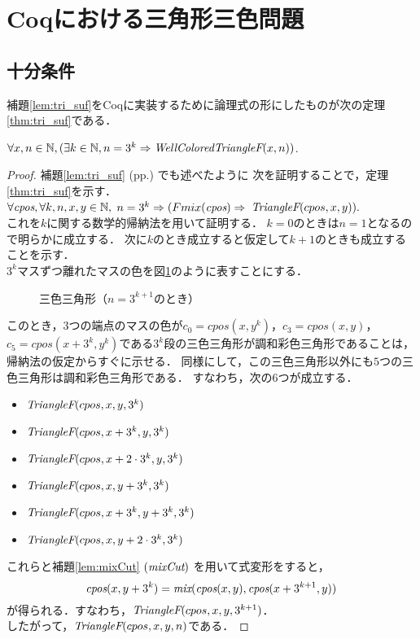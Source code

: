 \section{Coqにおける三角形三色問題}

\subsection{十分条件}
補題\ref{lem:tri_suf}をCoqに実装するために論理式の形にしたものが次の定理\ref{thm:tri_suf}である．
\begin{thm}[十分条件] \label{thm:tri_suf}
  $\forall x, n \in \mathbb{N}, (\exists k \in \mathbb{N}, n = 3 ^ k \Rightarrow \textit{WellColoredTriangleF}(x,n))$.
\end{thm}
\begin{proof}
  補題\ref{lem:tri_suf} (pp.\pageref{lem:tri_suf}) でも述べたように
  次を証明することで，定理\ref{thm:tri_suf}を示す．\\
  $\forall \textit{cpos}, \forall k, n, x, y \in \mathbb{N},$ $n = 3^k \Rightarrow (Fmix(\textit{cpos}) \Rightarrow$ $\textit{TriangleF}(cpos,x,y)).$ \\
  これを$k$に関する数学的帰納法を用いて証明する．
  $k=0$のときは$n=1$となるので明らかに成立する．
  次に$k$のとき成立すると仮定して$k+1$のときも成立することを示す．\\
  $3^k$マスずつ離れたマスの色を図\ref{fig:suf_steps}のように表すことにする．
  \begin{figure}[h]
    \centering
    
    \caption{三色三角形（$n=3^{k+1}$のとき）}
    \label{fig:suf_steps}
  \end{figure}
  このとき，$3$つの端点のマスの色が$c_0=cpos(x,y^k)$，$c_3=cpos(x,y)$，
  $c_5=cpos(x+3^k,y^k)$である$3^k$段の三色三角形が調和彩色三角形であることは，
  帰納法の仮定からすぐに示せる．
  同様にして，この三色三角形以外にも$5$つの三色三角形は調和彩色三角形である．
  すなわち，次の$6$つが成立する．
  \begin{itemize}
    \item $\textit{TriangleF}(cpos,x,y,3^k)$
    \item $\textit{TriangleF}(cpos,x+3^k,y,3^k)$
    \item $\textit{TriangleF}(cpos,x+2\cdot3^k,y,3^k)$
    \item $\textit{TriangleF}(cpos,x,y+3^k,3^k)$
    \item $\textit{TriangleF}(cpos,x+3^k,y+3^k,3^k)$
    \item $\textit{TriangleF}(cpos,x,y+2\cdot3^k,3^k)$
  \end{itemize}
  これらと補題\ref{lem:mixCut} $(\textit{mixCut})$ を用いて式変形をすると，
  \[
  \textit{cpos}(x,y+3^k)=\textit{mix}(\textit{cpos}(x,y),\textit{cpos}(x+3^{k+1},y))
  \]
  が得られる．すなわち，$\textit{TriangleF}(cpos,x,y,3^{k+1})$．\\
  したがって，$\textit{TriangleF}(cpos,x,y,n)$である．
\end{proof}


